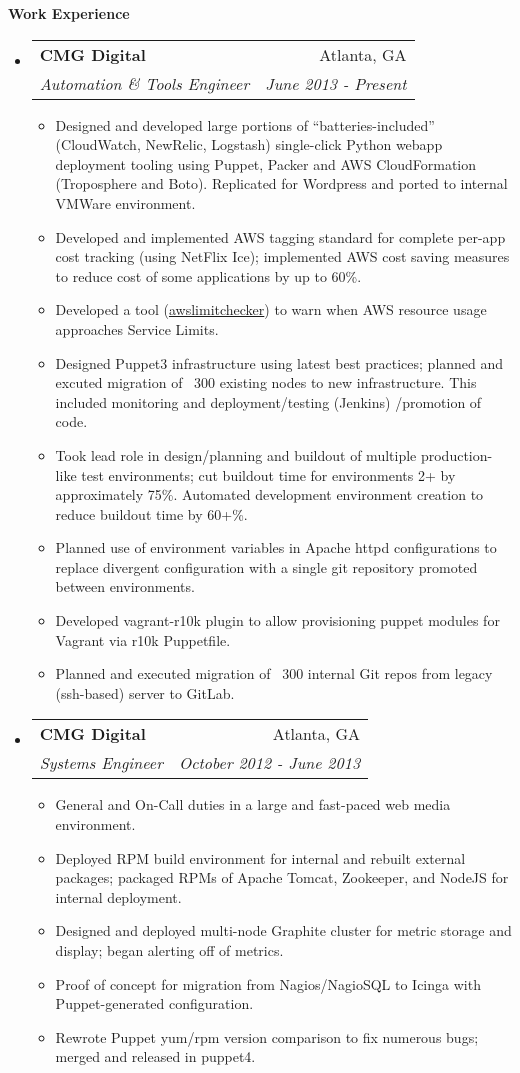 \documentclass[letterpaper,11pt]{article}
\makeatletter
\newcommand{\resitem}[1]{\item #1 \vspace{-2pt}}
\newcommand{\resheading}[1]{{\large \colorbox{mygrey}{\begin{minipage}{\textwidth}{\textbf{#1 \vphantom{p\^{E}}}}\end{minipage}}}}
\newcommand{\ressubheading}[4]{
\begin{tabular*}{7.0in}{l@{\extracolsep{\fill}}r}
		\textbf{#1} & #2 \\
		\textit{#3} & \textit{#4} \\
\end{tabular*}\vspace{-6pt}}
\makeatother
\begin{document}
\resheading{Work Experience}
\begin{itemize}
\item
	\ressubheading{CMG Digital}{Atlanta, GA}{Automation \& Tools Engineer}{June 2013 - Present}
	\begin{itemize}
                \resitem{Designed and developed large portions of ``batteries-included'' (CloudWatch, NewRelic, Logstash) single-click Python webapp deployment tooling using Puppet, Packer and AWS CloudFormation (Troposphere and Boto). Replicated for Wordpress and ported to internal VMWare environment.}
                \resitem{Developed and implemented AWS tagging standard for complete per-app cost tracking (using NetFlix Ice); implemented AWS cost saving measures to reduce cost of some applications by up to 60\%.}
                \resitem{Developed a tool (\href{https://github.com/jantman/awslimitchecker}{awslimitchecker}) to warn when AWS resource usage approaches Service Limits.}
                \resitem{Designed Puppet3 infrastructure using latest best practices; planned and excuted migration of ~300 existing nodes to new infrastructure. This included monitoring and deployment/testing (Jenkins) /promotion of code.}
                \resitem{Took lead role in design/planning and buildout of multiple production-like test environments; cut buildout time for environments 2+ by approximately 75\%. Automated development environment creation to reduce buildout time by 60+\%.}
                \resitem{Planned use of environment variables in Apache httpd configurations to replace divergent configuration with a single git repository promoted between environments.}
                \resitem{Developed vagrant-r10k plugin to allow provisioning puppet modules for Vagrant via r10k Puppetfile.}
                \resitem{Planned and executed migration of ~300 internal Git repos from legacy (ssh-based) server to GitLab.}
	\end{itemize}

\item
	\ressubheading{CMG Digital}{Atlanta, GA}{Systems Engineer}{October 2012 - June 2013}
	\begin{itemize}
                \resitem{General and On-Call duties in a large and fast-paced web media environment.}
                \resitem{Deployed RPM build environment for internal and rebuilt external packages; packaged RPMs of Apache Tomcat, Zookeeper, and NodeJS for internal deployment.}
                \resitem{Designed and deployed multi-node Graphite cluster for metric storage and display; began alerting off of metrics.}
                \resitem{Proof of concept for migration from Nagios/NagioSQL to Icinga with Puppet-generated configuration.}
                \resitem{Rewrote Puppet yum/rpm version comparison to fix numerous bugs; merged and released in puppet4.}
	\end{itemize}


\end{itemize}
\end{document}
